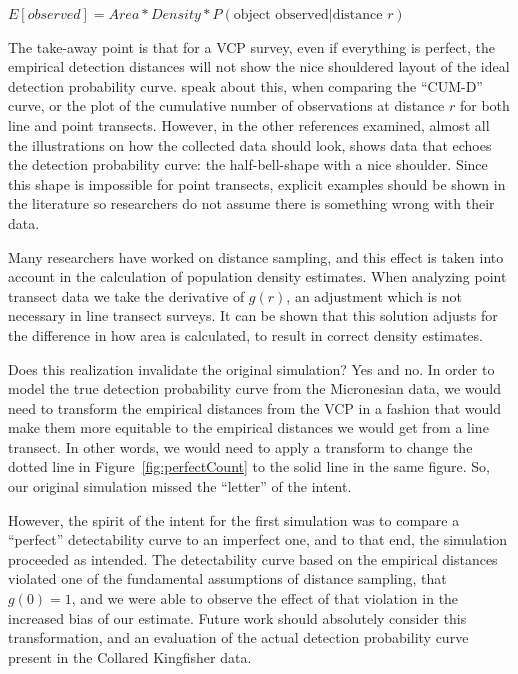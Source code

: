 \documentclass[12pt]{article}
\begin{document}
$E[observed] = Area*Density*P(\mbox{object observed}|\mbox{distance }r)$

The take-away point is that for a VCP survey, even if everything is perfect, the empirical detection distances will not show the nice shouldered layout of the ideal detection probability curve. \textcite{ramsey1981} speak about this, when comparing the ``CUM-D'' curve, or the plot of the cumulative number of observations at distance $r$ for both line and point transects. However, in the other references examined, almost all the illustrations on how the collected data should look, shows data that echoes the detection probability curve: the half-bell-shape with a nice shoulder. Since this shape is impossible for point transects, explicit examples should be shown in the literature so researchers do not assume there is something wrong with their data.

Many researchers have worked on distance sampling, and this effect is taken into account in the calculation of population density estimates. When analyzing point transect data we take the derivative of $g(r)$, an adjustment which is not necessary in line transect surveys. It can be shown that this solution adjusts for the difference in how area is calculated, to result in correct density estimates. 

Does this realization invalidate the original simulation? Yes and no. In order to model the true detection probability curve from the Micronesian data, we would need to transform the empirical distances from the VCP in a fashion that would make them more equitable to the empirical distances we would get from a line transect. In other words, we would need to apply a transform to change the dotted line in Figure~\ref{fig:perfectCount} to the solid line in the same figure. So, our original simulation missed the ``letter'' of the intent.

However, the spirit of the intent for the first simulation was to compare a ``perfect'' detectability curve to an imperfect one, and to that end, the simulation proceeded as intended. The detectability curve based on the empirical distances violated one of the fundamental assumptions of distance sampling, that $g(0)=1$, and we were able to observe the effect of that violation in the increased bias of our estimate. Future work should absolutely consider this transformation, and an evaluation of the actual detection probability curve present in the Collared Kingfisher data. 

\end{document}
